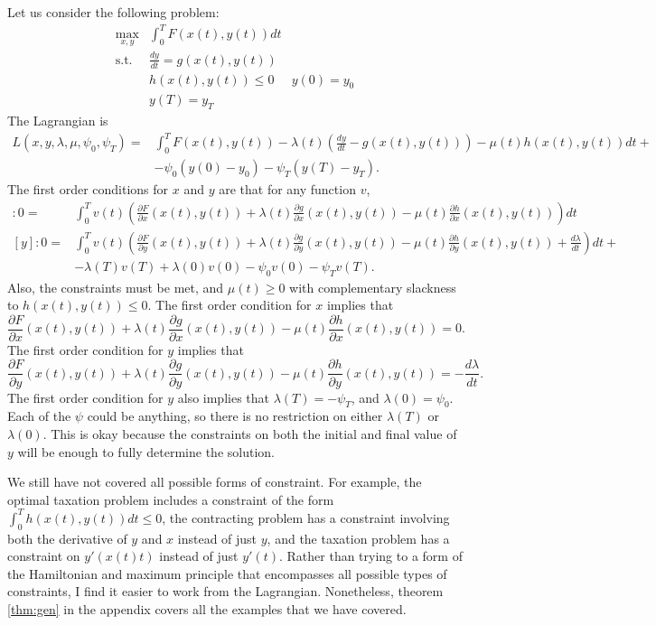 Let us consider the following problem:
\begin{align*}
  \max_{x,y} & \int_0^T F(x(t),y(t)) dt \\
  \text{s.t.} & \frac{dy}{dt} = g(x(t),y(t)) \\
  & h(x(t),y(t)) \leq 0 
  & y(0) = y_0 \\
  & y(T) = y_T 
\end{align*}
The Lagrangian is  
\begin{align*}
  L(x,y,\lambda, \mu, \psi_0,\psi_T) = & \int_0^T F(x(t),y(t)) -
\lambda(t) (\frac{dy}{dt} - g(x(t),y(t)) ) - \mu(t) h(x(t),y(t)) dt +
\\
& - \psi_0(y(0) - y_0) - \psi_T(y(T) - y_T). 
\end{align*}
The first order conditions for $x$ and $y$ are that for any function
$v$, 
\begin{align*}
  [x]: 0 = & \int_0^T v(t) \left(\frac{\partial F}{\partial
      x}(x(t),y(t)) + \lambda(t) \frac{\partial g}{\partial
      x}(x(t),y(t)) - \mu(t) \frac{\partial h}{\partial x}(x(t),y(t))
  \right) dt \\
  [y]: 0 = & \int_0^T v(t) \left(\frac{\partial F}{\partial
      y}(x(t),y(t)) + \lambda(t) \frac{\partial g}{\partial y}(x(t),y(t))
    - \mu(t) \frac{\partial h}{\partial y}(x(t),y(t)) +
  \frac{d\lambda}{dt} \right)dt + 
  \\ 
   & - \lambda(T)v(T) + \lambda(0)v(0)  - \psi_0v(0) - \psi_T v(T).
\end{align*}
Also, the constraints must be met, and $\mu(t) \geq 0$ with
complementary slackness to $h(x(t),y(t)) \leq 0$. The first order
condition for $x$ implies that
\[ \frac{\partial F}{\partial
  x}(x(t),y(t)) + \lambda(t) \frac{\partial g}{\partial
  x}(x(t),y(t)) - \mu(t) \frac{\partial h}{\partial x}(x(t),y(t))
= 0. \]
The first order condition for $y$ implies that 
\[ \frac{\partial F}{\partial
  y}(x(t),y(t)) + \lambda(t) \frac{\partial g}{\partial y}(x(t),y(t))
- \mu(t) \frac{\partial h}{\partial y}(x(t),y(t)) =
-\frac{d\lambda}{dt}. \]
The first order condition for $y$ also implies that $\lambda(T) =
-\psi_T$, and $\lambda(0) = \psi_0$. Each of the $\psi$ could be
anything, so there is no restriction on either $\lambda(T)$ or
$\lambda(0)$. This is okay because the constraints on both the initial
and final value of $y$ will be enough to fully determine the
solution. 

We still have not covered all possible forms of constraint. For
example, the optimal taxation problem includes a constraint of the
form $\int_0^T h(x(t),y(t)) dt \leq 0$, the contracting problem has a
constraint involving both the derivative of $y$ and $x$ instead of
just $y$, and the taxation problem has a constraint on $y'(x(t)t)$
instead of just $y'(t)$.  Rather than trying to a form of the
Hamiltonian and maximum principle that encompasses all possible types
of constraints, I find it easier to work from the
Lagrangian. Nonetheless, theorem \ref{thm:gen} in the appendix covers
all the examples that we have covered. 


